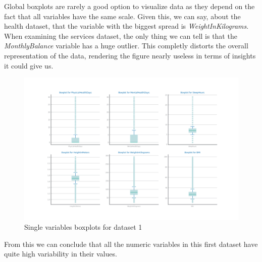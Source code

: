 \documentclass[10pt]{extarticle}
\begin{document}
Global boxplots are rarely a good option to visualize data as they depend on the fact that all variables have the same scale.
Given this, we can say, about the health dataset, that the variable with the biggest spread is \textit{WeightInKilograms}.
When examining the services dataset, the only thing we can tell is that the \textit{MonthlyBalance} variable has a huge outlier. This 
completly distorts the overall representation of the data, rendering the figure nearly useless in terms of insights it could give us.

\begin{figure}[H]
\centering\includegraphics[scale=0.60]{images/dataset1/data_profiling/CovidPos_single_boxplots.png}
\caption{Single variables boxplots for dataset 1}
\end{figure}
From this we can conclude that all the numeric variables in this first dataset have quite high variability in their values.
\end{document}
